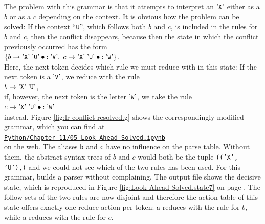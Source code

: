 The problem with this grammar is that it attempts to interpret an $\mbox{'\texttt{X}'}$ either
as a $b$ or as a $c$ depending on the context. It is obvious how the problem can be
solved: If the context ``\texttt{U}'', which follows both $b$ and $c$, is included in
the rules for $b$ and $c$, then the conflict disappears, because then the
state in which the conflict previously occurred has the form
\\[0.2cm]
\hspace*{1.3cm}
$\{ b \rightarrow \saquoted{X}\; \saquoted{U}\mdot: \saquoted{V},\;
    c \rightarrow \saquoted{X}\; \saquoted{U}\mdot: \saquoted{W}
\}
$.
\\[0.2cm]
Here, the next token decides which rule we must reduce with in this state:
If the next token is a $\mbox{'\texttt{V}'}$, we reduce with the rule
\\[0.2cm]
\hspace*{1.3cm}
$b \rightarrow \mbox{'\texttt{X}'}\; \mbox{'\texttt{U}'}$,
\\[0.2cm]
if, however, the next token is the letter $\mbox{'\texttt{W}'}$, we take the rule
\\[0.2cm]
\hspace*{1.3cm}
$c \rightarrow \saquoted{X}\; \saquoted{U}\mdot: \saquoted{W}$ 
\\[0.2cm]
instead.  Figure
\ref{fig:lr-conflict-resolved.g} shows the correspondingly modified grammar, which you can find at
\\[0.2cm]
\hspace*{1.3cm}
\href{https://github.com/karlstroetmann/Formal-Languages/blob/master/Python/Chapter-11/05-Look-Ahead-Solved.ipynb}{\texttt{Python/Chapter-11/05-Look-Ahead-Solved.ipynb}}
\\[0.2cm]
on the web.  The aliases \texttt{b} and \texttt{c} have no influence on the parse table.  Without them, the
abstract syntax trees of $b$ and $c$ would both be the tuple \texttt{(('X', 'U'),)} and we could not see which of
the two rules has been used.  For this grammar,  builds a parser without complaining.  The
output file shows the decisive state, which is reproduced in Figure \ref{fig:Look-Ahead-Solved.state7} on page
\pageref{fig:Look-Ahead-Solved.state7}.  The follow sets of the two rules are now disjoint and therefore the
action table of this state offers exactly one reduce action per token: a  reduces with the rule for
$b$, while a  reduces with the rule for $c$.

